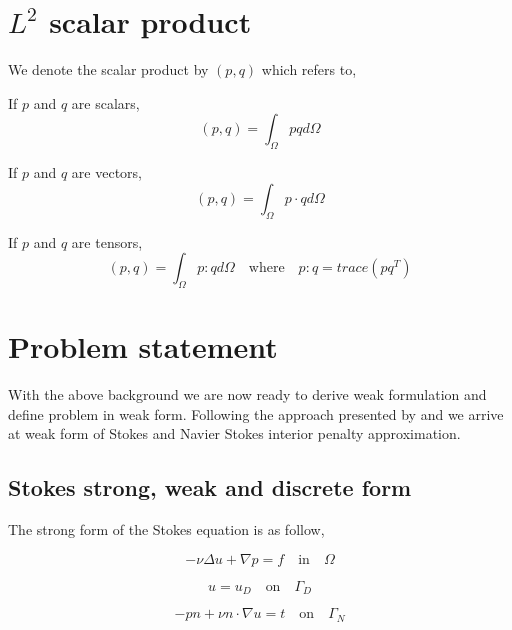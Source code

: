\documentclass[a4paper,12pt]{book}
\begin{document}
\section{$L^2$ scalar product}

We denote the scalar product by $(p,q)$ which refers to,

If $p$ and $q$ are scalars,
\begin{equation}\label{inner product scalars}
(p,q)=\int_{\Omega} pq d \Omega 
\end{equation}

If $p$ and $q$ are vectors,
\begin{equation}\label{Inner product vectors}
(p,q)=\int_{\Omega} p \cdot q d\Omega
\end{equation}

If $p$ and $q$ are tensors,
\begin{equation}\label{Inner product tensors}
(p,q)=\int_{\Omega} p:q d\Omega \quad \textrm{where} \quad p:q = trace(pq^T)
\end{equation}

\section{Problem statement}

With the above background we are now ready to derive weak formulation and define problem in weak form. Following the approach presented by \cite{Montlaur} and \cite{Montlaur2} we arrive at weak form of Stokes and Navier Stokes interior penalty approximation.

\subsection{Stokes strong, weak and discrete form} \label{Stokes_flow_ch3}

The strong form of the Stokes equation is as follow,

\begin{equation} \label{stokes_strong_form_ch3}
-\nu \Delta u + \nabla p = f \quad \textrm{in} \quad \Omega
\end{equation}

\begin{equation} \label{dirichlet condition stokes_ch3}
u = u_D \quad \textrm{on} \quad \Gamma_D
\end{equation}

\begin{equation} \label{neumann condition stokes_ch3}
-pn + \nu n \cdot \nabla u = t \quad \textrm{on} \quad \Gamma_N
\end{equation}
\end{document}
